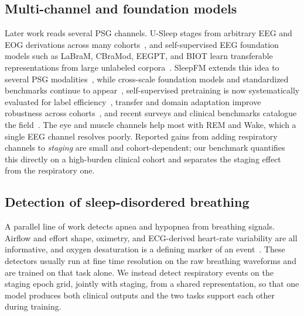 \documentclass[preprint,12pt]{elsarticle}
\begin{document}
\subsection{Multi-channel and foundation models}
Later work reads several PSG channels. U-Sleep stages from arbitrary EEG and EOG derivations
across many cohorts~\cite{perslev2021usleep}, and self-supervised EEG foundation models such
as LaBraM, CBraMod, EEGPT, and BIOT learn transferable representations from large unlabeled
corpora~\cite{labram2024,cbramod2025,eegpt2024,biot2023}. SleepFM extends this idea to several
PSG modalities~\cite{sleepfm2026}, while cross-scale foundation models and standardized
benchmarks continue to appear~\cite{csbrain2025,neuroatlas2026,sleepyland2026}, self-supervised
pretraining is now systematically evaluated for label efficiency~\cite{estevan2025ssl}, transfer
and domain adaptation improve robustness across cohorts~\cite{guillot2023transfer}, and recent
surveys and clinical benchmarks catalogue the field~\cite{yang2026review,hanif2025insomnia}. The eye and muscle channels help most with REM and Wake,
which a single EEG channel resolves poorly. Reported gains from adding respiratory channels to
\emph{staging} are small and cohort-dependent; our benchmark quantifies this directly on a
high-burden clinical cohort and separates the staging effect from the respiratory one.

\subsection{Detection of sleep-disordered breathing}
A parallel line of work detects apnea and hypopnea from breathing signals. Airflow and effort
shape, oximetry, and ECG-derived heart-rate variability are all informative, and oxygen
desaturation is a defining marker of an event~\cite{jing2025cpap}. These detectors usually run
at fine time resolution on the raw breathing waveforms and are trained on that task alone. We
instead detect respiratory events on the staging epoch grid, jointly with staging, from a
shared representation, so that one model produces both clinical outputs and the two tasks
support each other during training.
\end{document}
